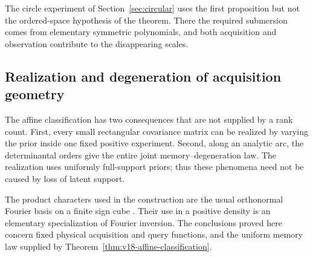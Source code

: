 The circle experiment of Section~\ref{sec:circular} uses the first
proposition but not the ordered-space hypothesis of the theorem. There
the required submersion comes from elementary symmetric polynomials,
and both acquisition and observation contribute to the disappearing
scales.


\subsection{Realization and degeneration of acquisition geometry}
\label{sec:v19-degeneration}
The affine classification has two consequences that are not supplied
by a rank count. First, every small rectangular covariance matrix can
be realized by varying the prior inside one fixed positive experiment.
Second, along an analytic arc, the determinantal orders give the entire
joint memory--degeneration law. The realization uses uniformly
full-support priors; thus these phenomena need not be caused by loss
of latent support.

The product characters used in the construction are the usual
orthonormal Fourier basis on a finite sign cube
\cite[Section 2.2]{deWolf2008}. Their use in a positive density is an
elementary specialization of Fourier inversion. The conclusions proved
here concern fixed physical acquisition and query functions, and the
uniform memory law supplied by Theorem~\ref{thm:v18-affine-classification}.

